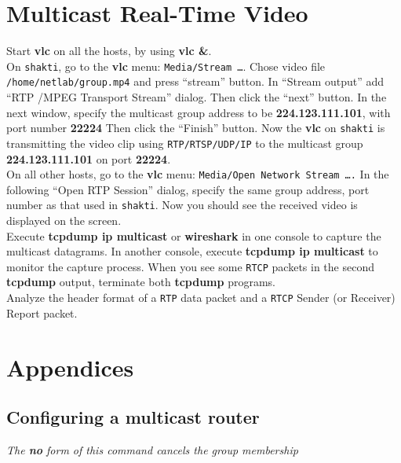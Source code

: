 \documentclass[10pt,a4paper]{article}
\numberwithin{equation}{section}
\numberwithin{figure}{section}
\numberwithin{table}{section}
\begin{document}
\section{Multicast Real-Time Video}
    Start \textbf{vlc} on all the hosts, by using \textbf{vlc \&}. \\
    On \texttt{shakti}, go to the \textbf{vlc} menu: \texttt{Media/Stream \ldots }. Chose video file \texttt{/home/netlab/group.mp4} and press “stream” button. In “Stream output” add “RTP /MPEG Transport Stream” dialog.
    Then click the “next” button.
    In the next window, specify the multicast group address to be \textbf{224.123.111.101}, with port number \textbf{22224} %
    Then click the “Finish” button.
    Now the \textbf{vlc} on \texttt{shakti} is transmitting the video clip using \texttt{RTP/RTSP/UDP/IP} to the multicast group \textbf{224.123.111.101} on port \textbf{22224}. \\
    On all other hosts, go to the \textbf{vlc} menu: \texttt{Media/Open Network Stream \ldots.} In the following “Open RTP Session” dialog, specify the same group address, port number as that used in \texttt{shakti}.%
    Now you should see the received video is displayed on the screen. \\
    Execute \textbf{tcpdump ip multicast} or \textbf{wireshark} in one console to capture the multicast datagrams.
    In another console, execute \textbf{tcpdump ip multicast} to monitor the capture process.
    When you see some \texttt{RTCP} packets in the second \textbf{tcpdump} output, terminate both \textbf{tcpdump} programs. \\
    Analyze the header format of a \texttt{RTP} data packet and a \texttt{RTCP} Sender (or Receiver) Report packet.


    \appendix
\section*{Appendices}
\renewcommand{\thesubsection}{\Alph{subsection}}

\subsection{Configuring a multicast router}
\textit{The \textbf{no} form of this command cancels the group membership}
\end{document}
